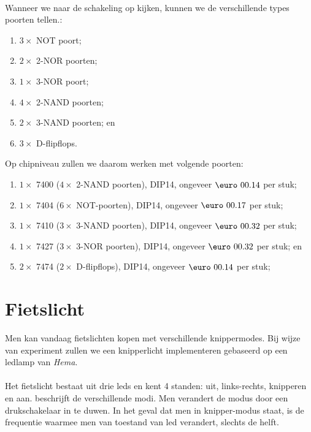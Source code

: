 \paragraph{}
Wanneer we naar de schakeling op  kijken, kunnen we de verschillende types poorten tellen.:
\begin{enumerate}
 \item $3\times$ NOT poort;%
 \item $2\times$ 2-NOR poorten;
 \item $1\times$ 3-NOR poort;
 \item $4\times$ 2-NAND poorten;%
 \item $2\times$ 3-NAND poorten; en%
 \item $3\times$ D-flipflops.%
\end{enumerate}
Op chipniveau zullen we daarom werken met volgende poorten:
\begin{enumerate}
 \item $1\times$ 7400 ($4\times$ 2-NAND poorten), DIP14, ongeveer $\mbox{\euro}\ 00.14$ per stuk;
 \item $1\times$ 7404 ($6\times$ NOT-poorten), DIP14, ongeveer $\mbox{\euro}\ 00.17$ per stuk;
 \item $1\times$ 7410 ($3\times$ 3-NAND poorten), DIP14, ongeveer $\mbox{\euro}\ 00.32$ per stuk;
 \item $1\times$ 7427 ($3\times$ 3-NOR poorten), DIP14, ongeveer $\mbox{\euro}\ 00.32$ per stuk; en
 \item $2\times$ 7474 ($2\times$ D-flipflops), DIP14, ongeveer $\mbox{\euro}\ 00.14$ per stuk;
\end{enumerate}
\section{Fietslicht}
Men kan vandaag fietslichten kopen met verschillende knippermodes. Bij wijze van experiment zullen we een knipperlicht implementeren gebaseerd op een ledlamp van \emph{Hema}.
\paragraph{}
Het fietslicht bestaat uit drie leds en kent 4 standen: uit, links-rechts, knipperen en aan.  beschrijft de verschillende modi. Men verandert de modus door een drukschakelaar in te duwen. In het geval dat men in knipper-modus staat, is de frequentie waarmee men van toestand van led verandert, slechts de helft.
